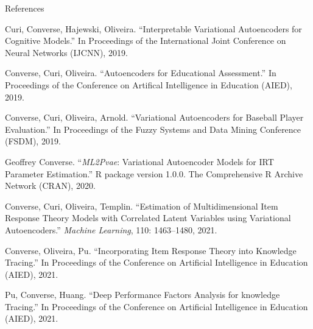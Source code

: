 \documentclass{beamer}
\theoremstyle{definition}
\begin{document}
\begin{frame}{References}
\begin{thebibliography}{6}
\tiny

 Curi, Converse, Hajewski, Oliveira. ``Interpretable Variational Autoencoders for Cognitive Models.'' In Proceedings of the International Joint Conference on Neural Networks (IJCNN), 2019.

 Converse, Curi, Oliveira. ``Autoencoders for Educational Assessment.'' In Proceedings of the Conference on Artifical Intelligence in Education (AIED), 2019.

 Converse, Curi, Oliveira, Arnold. ``Variational Autoencoders for Baseball Player Evaluation.'' In Proceedings of the Fuzzy Systems and Data Mining Conference (FSDM), 2019.  

 Geoffrey Converse. ``\textit{ML2Pvae}: Variational Autoencoder Models for IRT Parameter Estimation.'' R package version 1.0.0. The Comprehensive R Archive Network (CRAN), 2020.

 Converse, Curi, Oliveira, Templin. ``Estimation of Multidimensional Item Response Theory Models with Correlated Latent Variables using Variational Autoencoders.'' \textit{Machine Learning}, 110: 1463--1480, 2021.

 Converse, Oliveira, Pu. ``Incorporating Item Response Theory into Knowledge Tracing.'' In Proceedings of the Conference on Artificial Intelligence in Education (AIED), 2021.

 Pu, Converse, Huang. ``Deep Performance Factors Analysis for knowledge Tracing.'' In Proceedings of the Conference on Artificial Intelligence in Education (AIED), 2021.
\end{thebibliography}
\end{frame}

\begin{frame}
  \titlepage
\end{frame}
\end{document}

